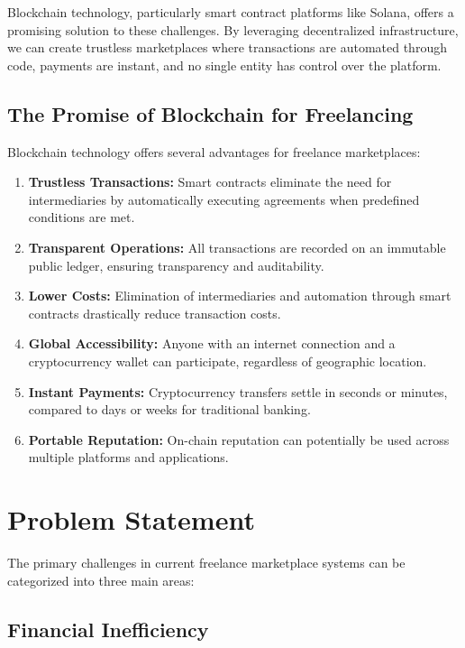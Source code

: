 \documentclass[a4paper,13pt,twoside]{report}
\theoremstyle{definition}
\begin{document}
Blockchain technology, particularly smart contract platforms like Solana, offers a promising solution to these challenges. By leveraging decentralized infrastructure, we can create trustless marketplaces where transactions are automated through code, payments are instant, and no single entity has control over the platform.

\subsection{The Promise of Blockchain for Freelancing}

Blockchain technology offers several advantages for freelance marketplaces:

\begin{enumerate}
    \item \textbf{Trustless Transactions:} Smart contracts eliminate the need for intermediaries by automatically executing agreements when predefined conditions are met.

    \item \textbf{Transparent Operations:} All transactions are recorded on an immutable public ledger, ensuring transparency and auditability.

    \item \textbf{Lower Costs:} Elimination of intermediaries and automation through smart contracts drastically reduce transaction costs.

    \item \textbf{Global Accessibility:} Anyone with an internet connection and a cryptocurrency wallet can participate, regardless of geographic location.

    \item \textbf{Instant Payments:} Cryptocurrency transfers settle in seconds or minutes, compared to days or weeks for traditional banking.

    \item \textbf{Portable Reputation:} On-chain reputation can potentially be used across multiple platforms and applications.
\end{enumerate}

\section{Problem Statement}

The primary challenges in current freelance marketplace systems can be categorized into three main areas:

\subsection{Financial Inefficiency}
\end{document}
